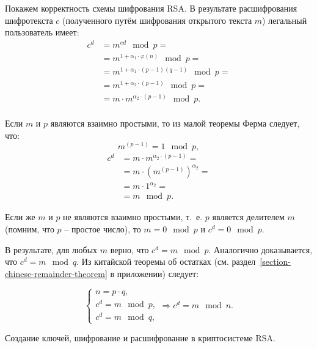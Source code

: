 Покажем корректность схемы шифрования RSA. В результате расшифрования шифротекста $c$ (полученного путём шифрования открытого текста $m$) легальный пользователь имеет:
\[\begin{array}{ll}
    c^{d} & = m^{ed} \mod p = \\
          & = m^{ 1 + \alpha_1 \cdot \varphi(n)} \mod p = \\
          & = m^{ 1 + \alpha_1 \cdot ( p - 1 ) ( q - 1 )} \mod p = \\
          & = m^{ 1 + \alpha_2 \cdot ( p - 1 )} \mod p = \\
          & = m \cdot m^{\alpha_2 \cdot ( p - 1 )} \mod p. \\
\end{array}\]

Если $m$ и $p$ являются взаимно простыми, то из малой теоремы Ферма следует, что:
	\[m^{\left( p - 1 \right)} = 1 \mod p,\]
\[\begin{array}{ll}
	c^{d} & = m \cdot m^{\alpha_2 \cdot \left( p - 1 \right)} = \\
	      & = m \cdot \left( m^{\left(p - 1\right)} \right)^{\alpha_2} = \\
	      & = m \cdot 1^{\alpha_2} = \\
	      & = m \mod p.
\end{array}\]

Если же $m$ и $p$ не являются взаимно простыми, т.~е. $p$ является делителем $m$ (помним, что $p$ -- простое число), то $m = 0 \mod p$ и $c^{d} = 0 \mod p$.

В результате, для любых $m$ верно, что $c^{d} = m \mod p$. Аналогично доказывается, что $c^{d} = m \mod q$. Из китайской теоремы об остатках (см. раздел~\ref{section-chinese-remainder-theorem} в приложении) следует:

\[\begin{cases}
	n = p \cdot q, \\
	c^{d} = m \mod p, \\
	c^{d} = m \mod q,
\end{cases} \Rightarrow c^{d} = m \mod n.\]

\example Создание ключей, шифрование и расшифрование в криптосистеме RSA.

